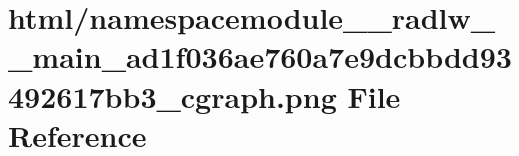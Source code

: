\hypertarget{namespacemodule____radlw____main__ad1f036ae760a7e9dcbbdd93492617bb3__cgraph_8png}{}\section{html/namespacemodule\+\_\+\+\_\+radlw\+\_\+\+\_\+main\+\_\+ad1f036ae760a7e9dcbbdd93492617bb3\+\_\+cgraph.png File Reference}
\label{namespacemodule____radlw____main__ad1f036ae760a7e9dcbbdd93492617bb3__cgraph_8png}

